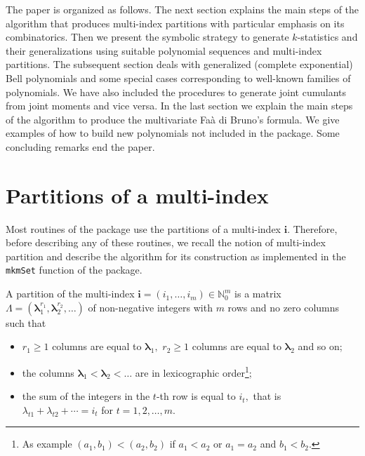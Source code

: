 The paper is organized as follows. The next section explains the main steps of the algorithm that produces multi-index partitions with particular emphasis on its combinatorics. Then we present the symbolic strategy to generate \(k\)-statistics and their generalizations using suitable polynomial sequences and multi-index partitions. The subsequent section deals with generalized (complete exponential) Bell polynomials and some special cases corresponding to well-known families of polynomials. We have also included the procedures to generate joint cumulants from joint moments and vice versa. In the last section we explain the main steps of the algorithm to produce the multivariate Faà di Bruno's formula. We give examples of how to build new polynomials not included in the package. Some concluding remarks end the paper.

\hypertarget{partitions-of-a-multi-index}{%
\section{Partitions of a multi-index}\label{partitions-of-a-multi-index}}

Most routines of the  package use the partitions of a multi-index \(\boldsymbol{i}.\) Therefore, before describing any of these routines, we recall the notion of multi-index partition and describe the algorithm for its construction as implemented in the \texttt{mkmSet} function of the package.

A partition of the multi-index \(\boldsymbol{i} = (i_1, \ldots, i_m) \in {\mathbb N}_0^m\) is a matrix \(\Lambda = (\boldsymbol{\lambda}_1^{r_1}, \boldsymbol{\lambda}_2^{r_2}, \ldots)\) of non-negative integers with \(m\) rows and no zero columns such that

\begin{itemize}
\item
  \(r_1 \geq 1\) columns are equal to \(\boldsymbol{\lambda}_1,\) \(r_2 \geq 1\) columns are equal to \(\boldsymbol{\lambda}_2\) and so on;
\item
  the columns \(\boldsymbol{\lambda}_1 < \boldsymbol{\lambda}_2 < \ldots\) are in lexicographic order\footnote{As example \((a_1,b_1) < (a_2,b_2)\) if \(a_1 < a_2\) or \(a_1=a_2\) and \(b_1<b_2.\)};
\item
  the sum of the integers in the \(t\)-th row is equal to \(i_t,\) that is \(\lambda_{t 1}+\lambda_{t 2}+\cdots = i_t\) for \(t = 1,2,\ldots,m.\)
\end{itemize}

